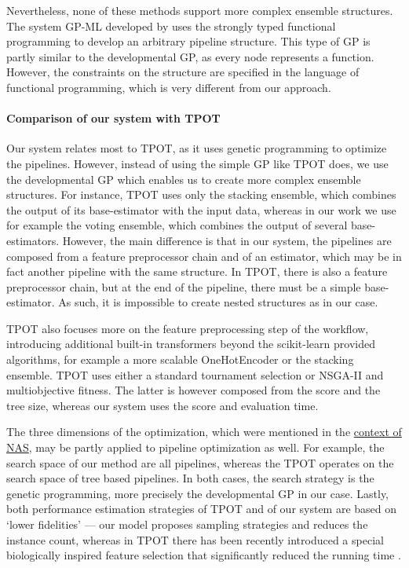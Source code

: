 Nevertheless, none of these methods support more complex ensemble structures. The
system GP-ML developed by \cite{Kren2017AutomaticCO} uses the strongly typed
functional programming to develop an arbitrary pipeline structure. This type of GP
is partly similar to the developmental GP, as every node represents a function.
However, the constraints on the structure are specified in the language of
functional programming, which is very different from our approach.

\paragraph{Comparison of our system with TPOT}
Our system relates most to TPOT, as it uses genetic programming to optimize
the pipelines. However, instead of using the simple GP like TPOT does, we use
the developmental GP which enables us to create more complex ensemble
structures. For instance, TPOT uses only the stacking ensemble, which combines the
output of its base-estimator with the input data, whereas in our work we use for
example the voting ensemble, which combines the output of several base-estimators.
However, the main difference is that in our system, the pipelines are composed
from a feature preprocessor chain and of an estimator, which may be in fact another
pipeline with the same structure. In TPOT, there is also a feature preprocessor
chain, but at the end of the pipeline, there must be a simple base-estimator. As such, it
is impossible to create nested structures as in our case.

TPOT also focuses more on the feature preprocessing step of the 
workflow, introducing additional built-in transformers beyond the scikit-learn 
provided algorithms, for example a more scalable OneHotEncoder or the stacking
ensemble. TPOT uses either a standard tournament selection or 
NSGA-II and multiobjective fitness. The latter is however composed from the 
score and the tree size, whereas our system uses the score and evaluation time.

The three dimensions of the optimization, which were mentioned in the
\hyperref[NAS:perf]{context of NAS}, may be partly applied to pipeline
optimization as well. For example, the search space of our method are all pipelines,
whereas the TPOT operates on the search space of tree based pipelines. In both cases,
the search strategy is the genetic programming, more precisely the developmental GP
in our case. Lastly, both performance estimation strategies of TPOT and of our
system are based on `lower fidelities' --- our model proposes sampling strategies and
reduces the instance count, whereas in TPOT there has been recently introduced a
special biologically inspired feature selection that significantly reduced the
running time \citep{Le502484}.

